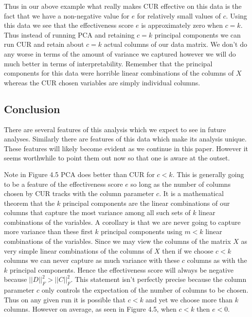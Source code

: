 \documentclass{book}
\begin{document}
Thus in our above example what really makes CUR effective on this data is the fact that we have a non-negative value for $e$ for relatively small values of $c$. Using this data we see that the effectiveness score $e$ is approximately zero when $c=k$. Thus instead of running PCA and retaining $c=k$ principal components we can run CUR and retain about $c=k$ actual columns of our data matrix. We don't do any worse in terms of the amount of variance we captured however we will do much better in terms of interpretability. Remember that the principal components for this data were horrible linear combinations of the columns of $X$ whereas the CUR chosen variables are simply individual columns. 

\subsection{Conclusion}

There are several features of this analysis which we expect to see in future analyses. Similarly there are features of this data which make its analysis unique. These features will likely become evident as we continue in this paper. However it seems worthwhile to point them out now so that one is aware at the outset. 

Note in Figure 4.5 PCA does better than CUR for $c<k$. This is generally going to be a feature of the effectiveness score $e$ so long as the number of columns chosen by CUR tracks with the column parameter $c$. It is a mathematical theorem that the $k$ principal components are the linear combinations of our columns that capture the most variance among all such sets of $k$ linear combinations of the variables. A corollary is that we are never going to capture more variance than these first $k$ principal components using $m<k$ linear combinations of the variables. Since we may view the columns of the matrix $X$ as very simple linear combinations of the columns of $X$ then if we choose $c<k$ columns we can never capture as much variance with these $c$ columns as with the $k$ principal components. Hence the effectiveness score will always be negative because $||D||^2_F>||C||_F^2$. This statement isn't perfectly precise because the column parameter $c$ only controls the expectation of the number of columns to be chosen. Thus on any given run it is possible that $c<k$ and yet we choose more than $k$ columns. However on average, as seen in Figure 4.5, when $c<k$ then $e<0$. 
\end{document}
